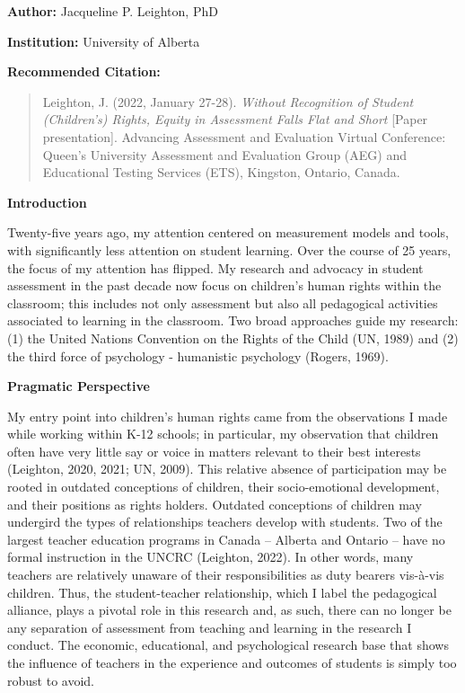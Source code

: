\documentclass[
]{book}
\begin{document}
\textbf{Author:} Jacqueline P. Leighton, PhD

\textbf{Institution:} University of Alberta

\textbf{Recommended Citation:}

\begin{quote}
Leighton, J. (2022, January 27-28). \emph{Without Recognition of Student (Children's) Rights, Equity in Assessment Falls Flat and Short} {[}Paper presentation{]}. Advancing Assessment and Evaluation Virtual Conference: Queen's University Assessment and Evaluation Group (AEG) and Educational Testing Services (ETS), Kingston, Ontario, Canada.
\end{quote}

\textbf{Introduction}

Twenty-five years ago, my attention centered on measurement models and tools, with significantly less attention on student learning. Over the course of 25 years, the focus of my attention has flipped. My research and advocacy in student assessment in the past decade now focus on children's human rights within the classroom; this includes not only assessment but also all pedagogical activities associated to learning in the classroom. Two broad approaches guide my research: (1) the United Nations Convention on the Rights of the Child (UN, 1989) and (2) the third force of psychology - humanistic psychology (Rogers, 1969).

\textbf{Pragmatic Perspective}

My entry point into children's human rights came from the observations I made while working within K-12 schools; in particular, my observation that children often have very little say or voice in matters relevant to their best interests (Leighton, 2020, 2021; UN, 2009). This relative absence of participation may be rooted in outdated conceptions of children, their socio-emotional development, and their positions as rights holders. Outdated conceptions of children may undergird the types of relationships teachers develop with students. Two of the largest teacher education programs in Canada -- Alberta and Ontario -- have no formal instruction in the UNCRC (Leighton, 2022). In other words, many teachers are relatively unaware of their responsibilities as duty bearers vis-à-vis children. Thus, the student-teacher relationship, which I label the pedagogical alliance, plays a pivotal role in this research and, as such, there can no longer be any separation of assessment from teaching and learning in the research I conduct. The economic, educational, and psychological research base that shows the influence of teachers in the experience and outcomes of students is simply too robust to avoid.
\end{document}
